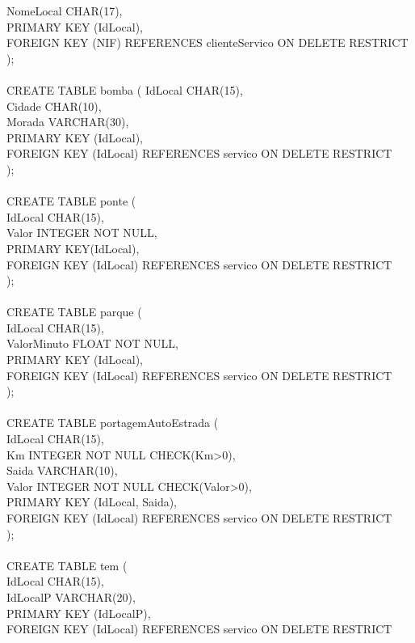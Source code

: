 \documentclass[a4paper]{article}
\begin{document}
NomeLocal CHAR(17),\\
PRIMARY KEY (IdLocal),\\
FOREIGN KEY (NIF) REFERENCES clienteServico ON DELETE RESTRICT\\
);\\
\\
\newpage
\noindent CREATE TABLE bomba (
IdLocal CHAR(15),\\
Cidade CHAR(10),\\
Morada VARCHAR(30),\\
PRIMARY KEY (IdLocal),\\
FOREIGN KEY (IdLocal) REFERENCES servico ON DELETE RESTRICT\\
);\\
\\
CREATE TABLE ponte (\\
IdLocal CHAR(15),\\
Valor INTEGER NOT NULL,\\
PRIMARY KEY(IdLocal),\\
FOREIGN KEY (IdLocal) REFERENCES servico ON DELETE RESTRICT\\
);\\
\\
CREATE TABLE parque (\\
IdLocal CHAR(15),\\
ValorMinuto FLOAT NOT NULL,\\
PRIMARY KEY (IdLocal),\\
FOREIGN KEY (IdLocal) REFERENCES servico ON DELETE RESTRICT\\
);\\
\\
CREATE TABLE portagemAutoEstrada (\\
IdLocal CHAR(15),\\
Km INTEGER NOT NULL CHECK(Km>0),\\
Saida VARCHAR(10),\\
Valor INTEGER NOT NULL CHECK(Valor>0),\\
PRIMARY KEY (IdLocal, Saida),\\
FOREIGN KEY (IdLocal) REFERENCES servico ON DELETE RESTRICT\\
);\\
\\
CREATE TABLE tem (\\
IdLocal CHAR(15),\\
IdLocalP VARCHAR(20),\\
PRIMARY KEY (IdLocalP),\\
FOREIGN KEY (IdLocal) REFERENCES servico ON DELETE RESTRICT\\
\end{document}
